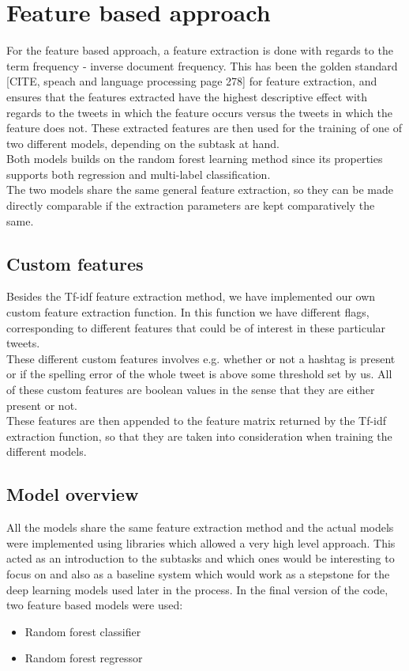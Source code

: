 
\section{Feature based approach}

For the feature based approach, a feature extraction is done with regards to the term frequency - inverse document frequency. This has been the golden standard [CITE, speach and language processing page 278] for feature extraction, and ensures that the features extracted have the highest descriptive effect with regards to the tweets in which the feature occurs versus the tweets in which the feature does not. These extracted features are then used for the training of one of two different models, depending on the subtask at hand.\\
Both models builds on the random forest learning method since its properties supports both regression and multi-label classification. \\
The two models share the same general feature extraction, so they can be made directly comparable if the extraction parameters are kept comparatively the same.
\subsection{Custom features}
Besides the Tf-idf feature extraction method, we have implemented our own custom feature extraction function. In this function we have different flags, corresponding to different features that could be of interest in these particular tweets. \\
These different custom features involves e.g. whether or not a hashtag is present or if the spelling error of the whole tweet is above some threshold set by us. All of these custom features are boolean values in the sense that they are either present or not. \\
These features are then appended to the feature matrix returned by the Tf-idf extraction function, so that they are taken into consideration when training the different models.

\subsection{Model overview}
All the models share the same feature extraction method and the actual models were implemented using libraries which allowed a very high level approach. This acted as an introduction to the subtasks and which ones would be interesting to focus on and also as a baseline system which would work as a stepstone for the deep learning models used later in the process. In the final version of the code, two feature based models were used:\\
\begin{itemize}
 \item Random forest classifier
 \item Random forest regressor
\end{itemize}
